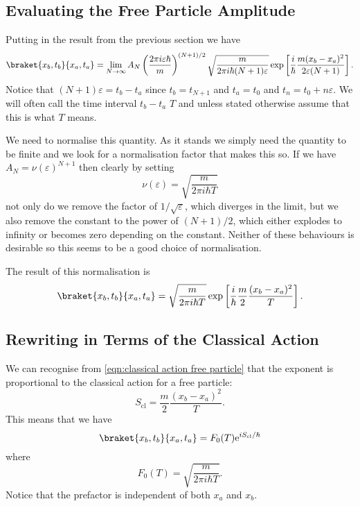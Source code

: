 \documentclass[fleqn]{NotesClass}
\newcommand*{\e}{\mathrm{e}}
\newcommand*{\cl}{\mathrm{cl}}
\begin{document}
    \subsection{Evaluating the Free Particle Amplitude}
    Putting in the result from the previous section we have
    \begin{equation}
        \braket{x_b, t_b}{x_a, t_a} = \lim_{N\to\infty} A_N \left( \frac{2\pi i \varepsilon \hbar}{m} \right)^{(N+1)/2} \sqrt{\frac{m}{2\pi i \hbar(N + 1)\varepsilon}} \exp\left[ \frac{i}{\hbar} \frac{m(x_b - x_a)^2}{2\varepsilon(N + 1)} \right].
    \end{equation}
    Notice that \((N + 1)\varepsilon = t_b - t_a\) since \(t_b = t_{N+1}\) and \(t_a = t_0\) and \(t_n = t_0 + n\varepsilon\).
    We will often call the time interval \(t_b - t_a\) \(T\) and unless stated otherwise assume that this is what \(T\) means.
    
    We need to normalise this quantity.
    As it stands we simply need the quantity to be finite and we look for a normalisation factor that makes this so.
    If we have \(A_N = \nu(\varepsilon)^{N + 1}\) then clearly by setting
    \begin{equation}
        \nu(\varepsilon) = \sqrt{\frac{m}{2\pi i\hbar T}}
    \end{equation}
    not only do we remove the factor of \(1/\sqrt{\varepsilon}\), which diverges in the limit, but we also remove the constant to the power of \((N + 1)/2\), which either explodes to infinity or becomes zero depending on the constant.
    Neither of these behaviours is desirable so this seems to be a good choice of normalisation.
    
    The result of this normalisation is
    \begin{equation}
        \braket{x_b, t_b}{x_a, t_a} = \sqrt{\frac{m}{2\pi i\hbar T}} \exp\left[ \frac{i}{\hbar} \frac{m}{2}\frac{(x_b - x_a)^2}{T} \right].
    \end{equation}

    \subsection{Rewriting in Terms of the Classical Action}
    We can recognise from \cref{eqn:classical action free particle} that the exponent is proportional to the classical action for a free particle:
    \begin{equation}
        S_{\cl} = \frac{m}{2}\frac{(x_b - x_a)^2}{T}.
    \end{equation}
    This means that we have
    \begin{equation}
        \braket{x_b, t_b}{x_a, t_a} = F_0(T) \e^{i S_{\cl}/\hbar}
    \end{equation}
    where
    \begin{equation}
        F_0(T) = \sqrt{\frac{m}{2\pi i\hbar T}}.
    \end{equation}
    Notice that the prefactor is independent of both \(x_a\) and \(x_b\).
    
\end{document}
